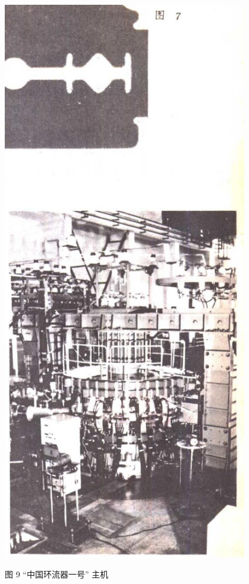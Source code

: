 \documentclass[10pt]{article}
\begin{document}
\begin{center}
\includegraphics[max width=0.8\textwidth]{images/01913056-1f15-74d8-9184-9aab52c9d66b_5_406445.jpg}
\end{center}

图 9 “中国环流器一号” 主机
\end{document}

